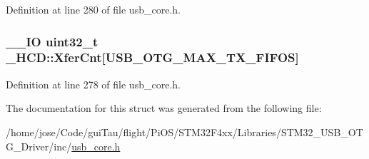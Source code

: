 Definition at line 280 of file usb\-\_\-core.\-h.

\hypertarget{struct___h_c_d_aad8cc80809ba0c9ca4a26d00cf9af5a1}{
\subsubsection[{Xfer\-Cnt}]{\setlength{\rightskip}{0pt plus 5cm}\-\_\-\-\_\-\-I\-O {\bf uint32\-\_\-t} \-\_\-\-H\-C\-D\-::\-Xfer\-Cnt\mbox{[}U\-S\-B\-\_\-\-O\-T\-G\-\_\-\-M\-A\-X\-\_\-\-T\-X\-\_\-\-F\-I\-F\-O\-S\mbox{]}}}\label{struct___h_c_d_aad8cc80809ba0c9ca4a26d00cf9af5a1}


Definition at line 278 of file usb\-\_\-core.\-h.



The documentation for this struct was generated from the following file\-:\begin{DoxyCompactItemize}
\item 
/home/jose/\-Code/gui\-Tau/flight/\-Pi\-O\-S/\-S\-T\-M32\-F4xx/\-Libraries/\-S\-T\-M32\-\_\-\-U\-S\-B\-\_\-\-O\-T\-G\-\_\-\-Driver/inc/\hyperlink{_s_t_m32_f4xx_2_libraries_2_s_t_m32___u_s_b___o_t_g___driver_2inc_2usb__core_8h}{usb\-\_\-core.\-h}\end{DoxyCompactItemize}
